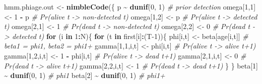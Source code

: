 \documentclass[
  12pt,
]{krantz}
\newenvironment{Shaded}{\begin{snugshade}}{\end{snugshade}}
\newcommand{\CommentTok}[1]{\textcolor[rgb]{0.56,0.35,0.01}{\textit{#1}}}
\newcommand{\ControlFlowTok}[1]{\textcolor[rgb]{0.13,0.29,0.53}{\textbf{#1}}}
\newcommand{\DecValTok}[1]{\textcolor[rgb]{0.00,0.00,0.81}{#1}}
\newcommand{\FunctionTok}[1]{\textcolor[rgb]{0.13,0.29,0.53}{\textbf{#1}}}
\newcommand{\NormalTok}[1]{#1}
\newcommand{\OtherTok}[1]{\textcolor[rgb]{0.56,0.35,0.01}{#1}}
\newcommand{\SpecialCharTok}[1]{\textcolor[rgb]{0.81,0.36,0.00}{\textbf{#1}}}
\begin{document}
\begin{Shaded}
\begin{Highlighting}[]
\NormalTok{hmm.phiage.out }\OtherTok{\textless{}{-}} \FunctionTok{nimbleCode}\NormalTok{(\{}
\NormalTok{  p }\SpecialCharTok{\textasciitilde{}} \FunctionTok{dunif}\NormalTok{(}\DecValTok{0}\NormalTok{, }\DecValTok{1}\NormalTok{) }\CommentTok{\# prior detection}
\NormalTok{  omega[}\DecValTok{1}\NormalTok{,}\DecValTok{1}\NormalTok{] }\OtherTok{\textless{}{-}} \DecValTok{1} \SpecialCharTok{{-}}\NormalTok{ p    }\CommentTok{\# Pr(alive t {-}\textgreater{} non{-}detected t)}
\NormalTok{  omega[}\DecValTok{1}\NormalTok{,}\DecValTok{2}\NormalTok{] }\OtherTok{\textless{}{-}}\NormalTok{ p        }\CommentTok{\# Pr(alive t {-}\textgreater{} detected t)}
\NormalTok{  omega[}\DecValTok{2}\NormalTok{,}\DecValTok{1}\NormalTok{] }\OtherTok{\textless{}{-}} \DecValTok{1}        \CommentTok{\# Pr(dead t {-}\textgreater{} non{-}detected t)}
\NormalTok{  omega[}\DecValTok{2}\NormalTok{,}\DecValTok{2}\NormalTok{] }\OtherTok{\textless{}{-}} \DecValTok{0}        \CommentTok{\# Pr(dead t {-}\textgreater{} detected t)}
  \ControlFlowTok{for}\NormalTok{ (i }\ControlFlowTok{in} \DecValTok{1}\SpecialCharTok{:}\NormalTok{N)\{}
    \ControlFlowTok{for}\NormalTok{ (t }\ControlFlowTok{in}\NormalTok{ first[i]}\SpecialCharTok{:}\NormalTok{(T}\DecValTok{{-}1}\NormalTok{))\{}
\NormalTok{    phi[i,t] }\OtherTok{\textless{}{-}}\NormalTok{ beta[age[i,t]] }\CommentTok{\# beta1 = phi1, beta2 = phi1+}
\NormalTok{    gamma[}\DecValTok{1}\NormalTok{,}\DecValTok{1}\NormalTok{,i,t] }\OtherTok{\textless{}{-}}\NormalTok{ phi[i,t]      }\CommentTok{\# Pr(alive t {-}\textgreater{} alive t+1)}
\NormalTok{    gamma[}\DecValTok{1}\NormalTok{,}\DecValTok{2}\NormalTok{,i,t] }\OtherTok{\textless{}{-}} \DecValTok{1} \SpecialCharTok{{-}}\NormalTok{ phi[i,t]  }\CommentTok{\# Pr(alive t {-}\textgreater{} dead t+1)}
\NormalTok{    gamma[}\DecValTok{2}\NormalTok{,}\DecValTok{1}\NormalTok{,i,t] }\OtherTok{\textless{}{-}} \DecValTok{0}           \CommentTok{\# Pr(dead t {-}\textgreater{} alive t+1)}
\NormalTok{    gamma[}\DecValTok{2}\NormalTok{,}\DecValTok{2}\NormalTok{,i,t] }\OtherTok{\textless{}{-}} \DecValTok{1}           \CommentTok{\# Pr(dead t {-}\textgreater{} dead t+1)}
\NormalTok{    \}}
\NormalTok{  \}}
\NormalTok{  beta[}\DecValTok{1}\NormalTok{] }\SpecialCharTok{\textasciitilde{}} \FunctionTok{dunif}\NormalTok{(}\DecValTok{0}\NormalTok{, }\DecValTok{1}\NormalTok{) }\CommentTok{\# phi1}
\NormalTok{  beta[}\DecValTok{2}\NormalTok{] }\SpecialCharTok{\textasciitilde{}} \FunctionTok{dunif}\NormalTok{(}\DecValTok{0}\NormalTok{, }\DecValTok{1}\NormalTok{) }\CommentTok{\# phi1+}

\end{Highlighting}
\end{Shaded}
\end{document}
